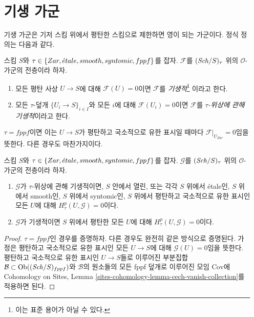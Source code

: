 \section{기생 가군}
\label{section-parasitic}

\noindent
기생 가군은 기저 스킴 위에서 평탄한 스킴으로 제한하면 영이 되는 가군이다.
정식 정의는 다음과 같다.

\begin{definition}
\label{definition-parasitic}
스킴 $S$와 $\tau \in \{Zar, {\acute{e}tale},
smooth, syntomic, fppf\}$를 잡자. $\mathcal{F}$를
$(\mathit{Sch}/S)_\tau$ 위의 $\mathcal{O}$-가군의 전층이라 하자.
\begin{enumerate}
\item 모든 평탄 사상 $U \to S$에 대해 $\mathcal{F}(U) = 0$이면
$\mathcal{F}$를 {\it 기생적}\footnote{이는 표준 용어가 아닐 수 있다.}
이라고 한다.
\item 모든 $\tau$-덮개 $\{U_i \to S\}_{i \in I}$와 모든 $i$에 대해
$\mathcal{F}(U_i) = 0$이면 $\mathcal{F}$를
{\it $\tau$-위상에 관해 기생적}이라고 한다.
\end{enumerate}
\end{definition}

\noindent
$\tau = fppf$이면 이는 $U \to S$가 평탄하고 국소적으로 유한 표시일 때마다
$\mathcal{F}|_{U_{Zar}} = 0$임을 뜻한다. 다른 경우도 마찬가지이다.

\begin{lemma}
\label{lemma-cohomology-parasitic}
스킴 $S$와 $\tau \in \{Zar, {\acute{e}tale}, smooth,
syntomic, fppf\}$를 잡자. $\mathcal{G}$를 $(\mathit{Sch}/S)_\tau$ 위의
$\mathcal{O}$-가군의 전층이라 하자.
\begin{enumerate}
\item $\mathcal{G}$가 $\tau$-위상에 관해 기생적이면, $S$ 안에서 열린,
또는 각각 $S$ 위에서 \'etale인, $S$ 위에서 smooth인,
$S$ 위에서 syntomic인, $S$ 위에서 평탄하고 국소적으로 유한 표시인
모든 $U$에 대해
$H^p_\tau(U, \mathcal{G}) = 0$이다.
\item $\mathcal{G}$가 기생적이면 $S$ 위에서 평탄한 모든 $U$에 대해
$H^p_\tau(U, \mathcal{G}) = 0$이다.
\end{enumerate}
\end{lemma}

\begin{proof}
$\tau = fppf$인 경우를 증명하자. 다른 경우도 완전히 같은 방식으로
증명된다. 가정은 평탄하고 국소적으로 유한 표시인 모든 $U \to S$에 대해
$\mathcal{G}(U) = 0$임을 뜻한다. 평탄하고 국소적으로 유한 표시인
$U \to S$들로 이루어진 부분집합
$\mathcal{B} \subset \mathop{\mathrm{Ob}}\nolimits((\mathit{Sch}/S)_{fppf})$와 $\mathcal{B}$의 원소들의
모든 fppf 덮개로 이루어진 모임 $\text{Cov}$에 Cohomology on Sites,
Lemma \ref{sites-cohomology-lemma-cech-vanish-collection}를 적용하면 된다.
\end{proof}

